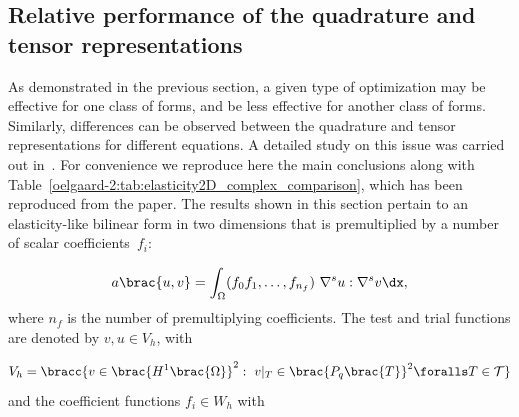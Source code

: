 \subsection{Relative performance of the quadrature and tensor
  representations}
\label{oelgaard-2:sec:performance_of_representations}

As demonstrated in the previous section, a given type of optimization
may be effective for one class of forms, and be less effective for
another class of forms.  Similarly, differences can be observed
between the quadrature and tensor representations for different
equations.  A detailed study on this issue was carried out
in~\citet{OelgaardWells2010}.  For convenience we reproduce here the
main conclusions along with
Table~\ref{oelgaard-2:tab:elasticity2D_complex_comparison}, which has
been reproduced from the paper.  The results shown in this section
pertain to an elasticity-like bilinear form in two dimensions that is
premultiplied by a number of scalar coefficients~$f_{i}$:

\begin{equation}
  a\brac{u, v} = \int_{\Omega} (f_0 f_1, \ldots, f_{n_f} )\ \nabla^s u
  : \nabla^s v \dx,
  \label{oelgaard-2:eq:elasticity_form}
\end{equation}
%
where $n_f$ is the number of premultiplying coefficients.
The test and trial functions are denoted by $v, u \in V_{h}$, with

\begin{equation}
  V_{h} = \bracc{v \in \brac{H^{1}\brac{\Omega}}^2: \ v\vert_T \in
    \brac{P_{q}\brac{T}}^2 \foralls T \in \mathcal{T}}
 \label{oelgaard-2:eq:elastictity_H1_vector_space}
\end{equation}
%
and the coefficient functions $f_{i} \in W_{h}$ with

